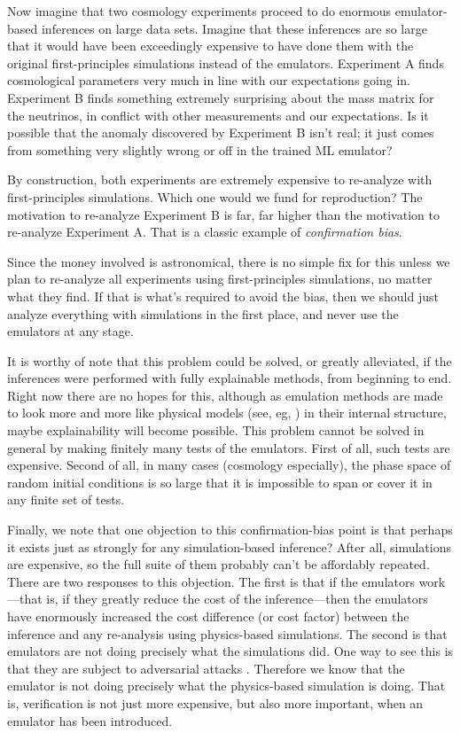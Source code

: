 \documentclass[10pt]{article}
\begin{document}
Now imagine that two cosmology experiments proceed to do enormous emulator-based inferences on large data sets.
Imagine that these inferences are so large that it would have been exceedingly expensive to have done them with the original first-principles simulations instead of the emulators.
Experiment A finds cosmological parameters very much in line with our expectations going in.
Experiment B finds something extremely surprising about the mass matrix for the neutrinos, in conflict with other measurements and our expectations.
Is it possible that the anomaly discovered by Experiment B isn't real; it just comes from something very slightly wrong or off in the trained ML emulator?

By construction, both experiments are extremely expensive to re-analyze with first-principles simulations.
Which one would we fund for reproduction?
The motivation to re-analyze Experiment B is far, far higher than the motivation to re-analyze Experiment A.
That is a classic example of \emph{confirmation bias}.

Since the money involved is astronomical, there is no simple fix for this unless we plan to re-analyze all experiments using first-principles simulations, no matter what they find.
If that is what's required to avoid the bias, then we should just analyze everything with simulations in the first place, and never use the emulators at any stage.

It is worthy of note that this problem could be solved, or greatly alleviated, if the inferences were performed with fully explainable methods, from beginning to end.
Right now there are no hopes for this, although as emulation methods are made to look more and more like physical models (see, eg, \citealt{scalars}) in their internal structure, maybe explainability will become possible.
This problem cannot be solved in general by making finitely many tests of the emulators.
First of all, such tests are expensive.
Second of all, in many cases (cosmology especially), the phase space of random initial conditions is so large that it is impossible to span or cover it in any finite set of tests.

Finally, we note that one objection to this confirmation-bias point is that perhaps it exists just as strongly for any simulation-based inference?
After all, simulations are expensive, so the full suite of them probably can't be affordably repeated.
There are two responses to this objection.
The first is that if the emulators work---that is, if they greatly reduce the cost of the inference---then the emulators have enormously increased the cost difference (or cost factor) between the inference and any re-analysis using physics-based simulations.
The second is that emulators are not doing precisely what the simulations did.
One way to see this is that they are subject to adversarial attacks \cite{melchior}.
Therefore we know that the emulator is not doing precisely what the physics-based simulation is doing.
That is, verification is not just more expensive, but also more important, when an emulator has been introduced.
\end{document}

